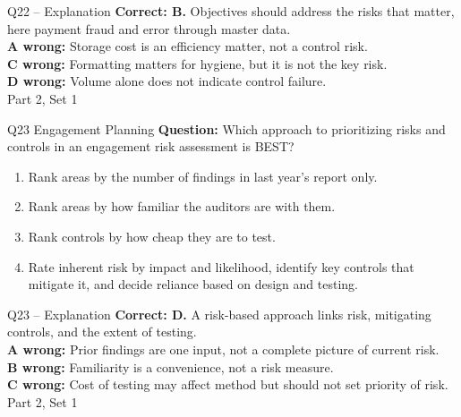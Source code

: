 \documentclass[aspectratio=169,10pt]{beamer}
\begin{document}
\begin{frame}[t]{Q22 -- Explanation}
	\footnotesize
	\textbf{Correct: B.} Objectives should address the risks that matter, here payment fraud and error through master data. \\[5pt]
\textbf{A wrong:} Storage cost is an efficiency matter, not a control risk. \\[3pt]
\textbf{C wrong:} Formatting matters for hygiene, but it is not the key risk. \\[3pt]
\textbf{D wrong:} Volume alone does not indicate control failure. \\[3pt]
	\vfill {\tiny Part 2, Set 1}
\end{frame}
\begin{frame}[t]{Q23 \hfill {\scriptsize Engagement Planning}}
	\small
	\textbf{Question:} Which approach to prioritizing risks and controls in an engagement risk assessment is BEST?
	\begin{enumerate}[label=\Alph*.,itemsep=1pt,topsep=3pt]
			\item Rank areas by the number of findings in last year's report only.
			\item Rank areas by how familiar the auditors are with them.
			\item Rank controls by how cheap they are to test.
			\item Rate inherent risk by impact and likelihood, identify key controls that mitigate it, and decide reliance based on design and testing.
	\end{enumerate}
\end{frame}
\begin{frame}[t]{Q23 -- Explanation}
	\footnotesize
	\textbf{Correct: D.} A risk-based approach links risk, mitigating controls, and the extent of testing. \\[5pt]
\textbf{A wrong:} Prior findings are one input, not a complete picture of current risk. \\[3pt]
\textbf{B wrong:} Familiarity is a convenience, not a risk measure. \\[3pt]
\textbf{C wrong:} Cost of testing may affect method but should not set priority of risk. \\[3pt]
	\vfill {\tiny Part 2, Set 1}
\end{frame}
\end{document}
